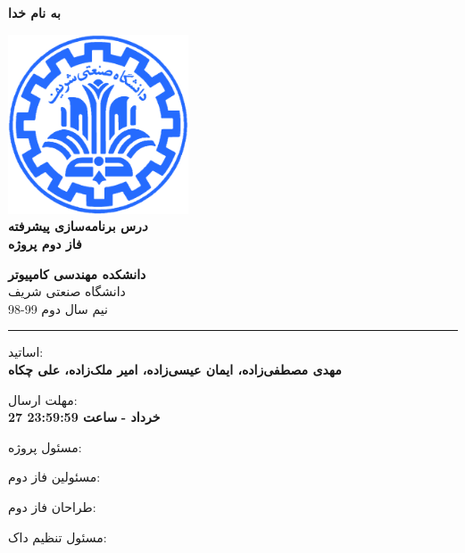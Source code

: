 \documentclass[]{article}
\begin{document}
\begin{titlepage}
\begin{center}

\textbf{ \Huge{به نام خدا} }
        
\vspace{0.2cm}

\includegraphics[width=0.4\textwidth]{sharif1.png}\\
\vspace{0.2cm}
\textbf{ \Huge{\emph درس برنامه‌سازی پیشرفته} }\\
\vspace{0.25cm}
\textbf{ \Large{ فاز دوم پروژه} }
\vspace{0.2cm}
       
 
      \large \textbf{دانشکده مهندسی کامپیوتر}\\\vspace{0.1cm}
    \large   دانشگاه صنعتی شریف\\\vspace{0.2cm}
       \large   ﻧﯿﻢ سال دوم 99-98 \\\vspace{0.10cm}
      \noindent\rule[1ex]{\linewidth}{1pt}
اساتید:\\
    \textbf{{مهدی مصطفی‌زاده، ایمان عیسی‌زاده، امیر ملک‌زاده، علی چکاه}}



    \vspace{0.20cm}

   مهلت ارسال:\\
    \textbf{{27 خرداد - }}
    \textbf{{ساعت 23:59:59}}

    \vspace{0.10cm}
مسئول پروژه:\\
    \textbf{}
    
        \vspace{0.10cm}
مسئولین فاز دوم:\\
    \textbf{}
    
        \vspace{0.10cm}
طراحان فاز دوم:\\
    \textbf{}
    
        \vspace{0.05cm}
مسئول تنظیم داک:\\
    \textbf{}
    

\end{center}
\end{titlepage}
\end{document}
